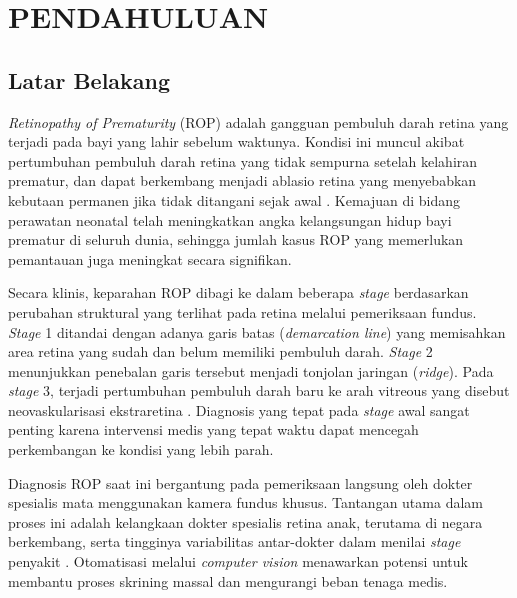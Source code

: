 
\chapter{PENDAHULUAN}

\section{Latar Belakang}

\textit{Retinopathy of Prematurity} (ROP) adalah gangguan pembuluh darah retina yang terjadi
pada bayi yang lahir sebelum waktunya. Kondisi ini muncul akibat pertumbuhan pembuluh darah
retina yang tidak sempurna setelah kelahiran prematur, dan dapat berkembang menjadi ablasio
retina yang menyebabkan kebutaan permanen jika tidak ditangani sejak awal
\citep{Chiang2021, Vahidmoghadam2026}. Kemajuan di bidang perawatan neonatal telah meningkatkan
angka kelangsungan hidup bayi prematur di seluruh dunia, sehingga jumlah kasus ROP yang
memerlukan pemantauan juga meningkat secara signifikan.

Secara klinis, keparahan ROP dibagi ke dalam beberapa \textit{stage} berdasarkan perubahan
struktural yang terlihat pada retina melalui pemeriksaan fundus. \textit{Stage} 1 ditandai
dengan adanya garis batas (\textit{demarcation line}) yang memisahkan area retina yang sudah
dan belum memiliki pembuluh darah. \textit{Stage} 2 menunjukkan penebalan garis tersebut
menjadi tonjolan jaringan (\textit{ridge}). Pada \textit{stage} 3, terjadi pertumbuhan
pembuluh darah baru ke arah vitreous yang disebut neovaskularisasi ekstraretina
\citep{Chiang2021}. Diagnosis yang tepat pada \textit{stage} awal sangat penting karena
intervensi medis yang tepat waktu dapat mencegah perkembangan ke kondisi yang lebih parah.

Diagnosis ROP saat ini bergantung pada pemeriksaan langsung oleh dokter spesialis mata
menggunakan kamera fundus khusus. Tantangan utama dalam proses ini adalah kelangkaan dokter
spesialis retina anak, terutama di negara berkembang, serta tingginya variabilitas antar-dokter
dalam menilai \textit{stage} penyakit \citep{Tong2020}. Otomatisasi melalui \textit{computer
vision} menawarkan potensi untuk membantu proses skrining massal dan mengurangi beban tenaga
medis.

